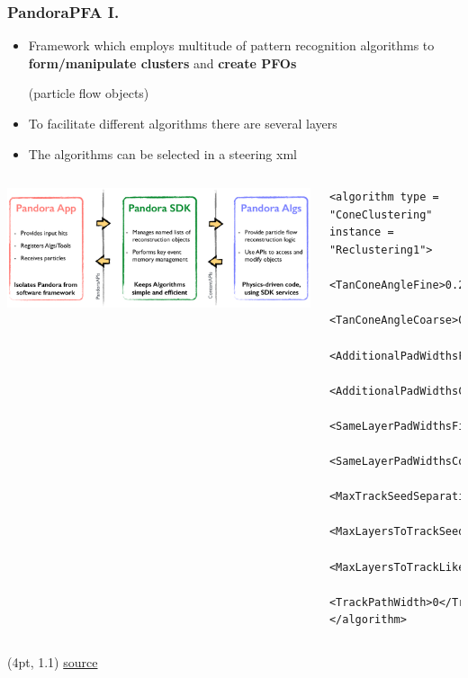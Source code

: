 \documentclass[aspectratio=169]{beamer}
\newcommand{\bluetext}[1]{%
  \textcolor{myBlue}{#1}
}
\begin{document}
\begin{frame}[fragile]
  \frametitle{PandoraPFA I.}

  \begin{itemize}
    \item Framework which employs multitude of pattern recognition algorithms
      to \bluetext{\bf form/manipulate clusters} and \bluetext{\bf create PFOs}
      (particle flow objects)
    \item To facilitate different algorithms there are several layers
    \item The algorithms can be selected in a steering xml
  \end{itemize}


  \begin{columns}[c]

    \begin{center}
      \includegraphics[width=\textwidth]{figures/pandora_apis.pdf}
    \end{center}


    \fontsize{5}{8} \selectfont
    \begin{verbatim}
<algorithm type = "ConeClustering" instance = "Reclustering1">
    <TanConeAngleFine>0.24</TanConeAngleFine>
    <TanConeAngleCoarse>0.4</TanConeAngleCoarse>
    <AdditionalPadWidthsFine>2</AdditionalPadWidthsFine>
    <AdditionalPadWidthsCoarse>2</AdditionalPadWidthsCoarse>
    <SameLayerPadWidthsFine>2.24</SameLayerPadWidthsFine>
    <SameLayerPadWidthsCoarse>1.44</SameLayerPadWidthsCoarse>
    <MaxTrackSeedSeparation>100</MaxTrackSeedSeparation>
    <MaxLayersToTrackSeed>0</MaxLayersToTrackSeed>
    <MaxLayersToTrackLikeHit>0</MaxLayersToTrackLikeHit>
    <TrackPathWidth>0</TrackPathWidth>
</algorithm>
    \end{verbatim}
  \end{columns}


  \begin{textblock*}{\paperwidth}(4pt, 1.1\textheight)
    \tiny
    \href{https://github.com/PandoraPFA/Documentation/blob/master/Pandora_Example.pdf}
         {source}
  \end{textblock*}
\end{frame}
\end{document}
